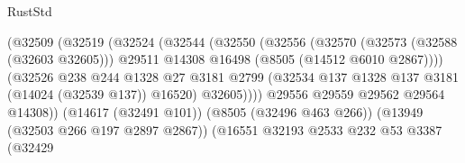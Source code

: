 \begin{lexlean}{RustStd}
\begin{coremodule}
                                            (@32509
                                              (@32519
                                                (@32524
                                                  (@32544
                                                    (@32550
                                                      (@32556
                                                        (@32570
                                                          (@32573 (@32588 (@32603 @32605)))
                                                          @29511
                                                          @14308
                                                          @16498
                                                          (@8505 (@14512 @6010 @2867))))
                                                      (@32526
                                                        @238
                                                        @244
                                                        @1328
                                                        @27
                                                        @3181
                                                        @2799
                                                        (@32534
                                                          @137
                                                          @1328
                                                          @137
                                                          @3181
                                                          (@14024 (@32539 @137))
                                                          @16520)
                                                        @32605))))
                                                @29556
                                                @29559
                                                @29562
                                                @29564
                                                @14308))
                                            (@14617 (@32491 @101))
                                            (@8505 (@32496 @463 @266))
                                            (@13949 (@32503 @266 @197 @2897 @2867))
                                            (@16551
                                              @32193
                                              @2533
                                              @232
                                              @53
                                              @3387
                                              (@32429

\end{coremodule}
\end{lexlean}
